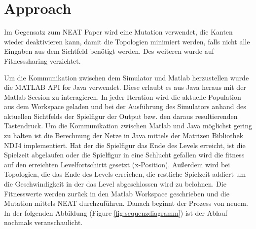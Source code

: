 \documentclass{hbrs-ecta-report}
\begin{document}
\FloatBarrier
\section{Approach}
Im Gegensatz zum NEAT Paper \cite{Stanley2002a} wird eine Mutation verwendet, die Kanten wieder deaktivieren kann, damit die Topologien minimiert werden, falls nicht alle Eingaben aus dem Sichtfeld benötigt werden. 
Des weiteren wurde auf Fitnesssharing verzichtet.


Um die Kommunikation zwischen dem Simulator und Matlab herzustellen wurde die MATLAB API for Java verwendet. Diese erlaubt es aus Java heraus mit der Matlab Seesion zu interagieren.
In jeder Iteration wird die aktuelle Population aus dem Workspace geladen und bei der Ausführung des Simulators anhand des aktuellen Sichtfelds der Spielfigur der Output bzw. den daraus resultierenden Tastendruck. 
Um die Kommunikation zwischen Matlab und Java möglichst gering zu halten ist die Berechnung der Netze in Java mittels der Matrizen Bibliothek NDJ4 %
implementiert. 
Hat der die Spielfigur das Ende des Levels erreicht, ist die Spielzeit abgelaufen oder die Spielfigur in eine Schlucht gefallen wird die fitness auf den erreichten Levelfortschirtt gesetzt (x-Position). Außerdem wird bei Topologien, die das Ende des Levels erreichen, die restliche Spielzeit addiert um die Geschwindigkeit in der das Level abgeschlossen wird zu belohnen. Die Fitnesswerte werden zurück in den Matlab Workspace geschrieben und die Mutation mittels NEAT durchzuführen. Danach beginnt der Prozess von neuem. 
In der folgenden Abbildung (Figure \ref{fig:sequenzdiagramm}) ist der Ablauf nochmals veranschaulicht.
\end{document}
